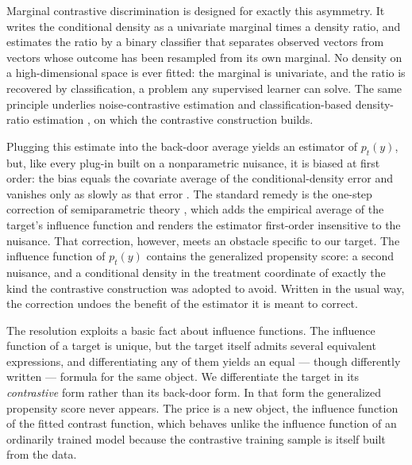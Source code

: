 \documentclass[11pt]{article}
\theoremstyle{plain}
\theoremstyle{definition}
\theoremstyle{remark}
\begin{document}
Marginal contrastive discrimination \citep{meziani2025mcd} is designed for exactly this
asymmetry. It writes the conditional density as a univariate marginal times a density ratio,
and estimates the ratio by a binary classifier that separates observed vectors from vectors
whose outcome has been resampled from its own marginal. No density on a high-dimensional
space is ever fitted: the marginal is univariate, and the ratio is recovered by
classification, a problem any supervised learner can solve. The same principle underlies
noise-contrastive estimation \citep{gutmann2010nce} and classification-based density-ratio
estimation \citep{sugiyama2012density}, on which the contrastive construction builds.

Plugging this estimate into the back-door average yields an estimator of $p_t(y)$, but, like
every plug-in built on a nonparametric nuisance, it is biased at first order: the bias
equals the covariate average of the conditional-density error and vanishes only as slowly as
that error \citep{bickel1988,robins2008}. The standard remedy is the one-step correction of
semiparametric theory \citep{vanderlaan2006tmle,chernozhukov2018,kennedy2022review}, which
adds the empirical average of the target's influence function and renders the estimator
first-order insensitive to the nuisance. That correction, however, meets an obstacle
specific to our target. The influence function of $p_t(y)$ contains the generalized
propensity score: a second nuisance, and a conditional density in the treatment coordinate
of exactly the kind the contrastive construction was adopted to avoid. Written in the usual
way, the correction undoes the benefit of the estimator it is meant to correct.

The resolution exploits a basic fact about influence functions. The influence function of a
target is unique, but the target itself admits several equivalent expressions, and
differentiating any of them yields an equal --- though differently written --- formula for
the same object. We differentiate the target in its \emph{contrastive} form rather than its
back-door form. In that form the generalized propensity score never appears. The price is a
new object, the influence function of the fitted contrast function, which behaves unlike the
influence function of an ordinarily trained model because the contrastive training sample is
itself built from the data.
\end{document}
